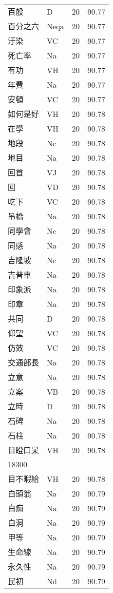 \documentclass[twocolumn]{book}
\begin{document}
\begin{supertabular}{llrr}
百般 & D & 20 &  90.77\\
百分之六 & Neqa & 20 &  90.77\\
汙染 & VC & 20 &  90.77\\
死亡率 & Na & 20 &  90.77\\
有功 & VH & 20 &  90.77\\
年費 & Na & 20 &  90.77\\
安頓 & VC & 20 &  90.77\\
如何是好 & VH & 20 &  90.78\\
在學 & VH & 20 &  90.78\\
地段 & Nc & 20 &  90.78\\
地目 & Na & 20 &  90.78\\
回首 & VJ & 20 &  90.78\\
回 & VD & 20 &  90.78\\
吃下 & VC & 20 &  90.78\\
吊橋 & Na & 20 &  90.78\\
同學會 & Nc & 20 &  90.78\\
同感 & Na & 20 &  90.78\\
吉隆坡 & Nc & 20 &  90.78\\
吉普車 & Na & 20 &  90.78\\
印象派 & Na & 20 &  90.78\\
印章 & Na & 20 &  90.78\\
共同 & D & 20 &  90.78\\
仰望 & VC & 20 &  90.78\\
仿效 & VC & 20 &  90.78\\
交通部長 & Na & 20 &  90.78\\
立意 & Na & 20 &  90.78\\
立案 & VB & 20 &  90.78\\
立時 & D & 20 &  90.78\\
石碑 & Na & 20 &  90.78\\
石柱 & Na & 20 &  90.78\\
目瞪口呆 & VH & 20 &  90.78\\
18300\\
目不暇給 & VH & 20 &  90.78\\
白頭翁 & Na & 20 &  90.79\\
白痴 & Na & 20 &  90.79\\
白洞 & Na & 20 &  90.79\\
甲等 & Na & 20 &  90.79\\
生命線 & Na & 20 &  90.79\\
永久性 & Na & 20 &  90.79\\
民初 & Nd & 20 &  90.79\\

\end{supertabular}
\end{document}
